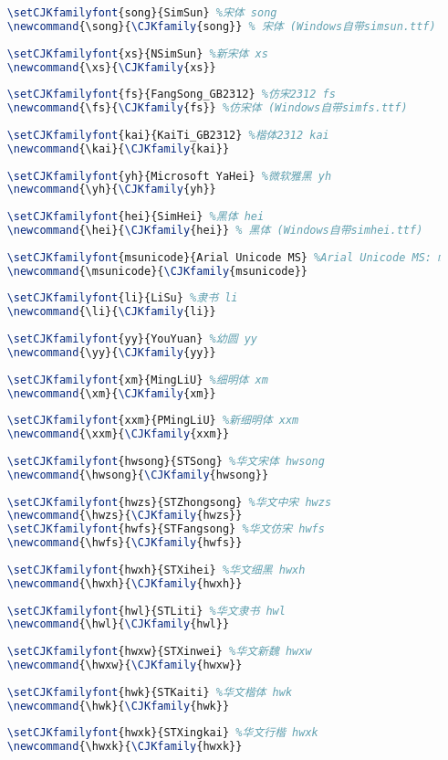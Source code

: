 \documentclass[10pt,a4paper,openany]{article}
\newcommand{\song}{\CJKfamily{song}} %
\newcommand{\xs}{\CJKfamily{xs}}
\newcommand{\fs}{\CJKfamily{fs}} %
\newcommand{\kai}{\CJKfamily{kai}}
\newcommand{\yh}{\CJKfamily{yh}}
\newcommand{\hei}{\CJKfamily{hei}} %
\newcommand{\msunicode}{\CJKfamily{msunicode}}
\newcommand{\li}{\CJKfamily{li}}
\newcommand{\yy}{\CJKfamily{yy}}
\newcommand{\xm}{\CJKfamily{xm}}
\newcommand{\xxm}{\CJKfamily{xxm}}
\newcommand{\hwsong}{\CJKfamily{hwsong}}
\newcommand{\hwzs}{\CJKfamily{hwzs}}
\newcommand{\hwfs}{\CJKfamily{hwfs}}
\newcommand{\hwxh}{\CJKfamily{hwxh}}
\newcommand{\hwl}{\CJKfamily{hwl}}
\newcommand{\hwxw}{\CJKfamily{hwxw}}
\newcommand{\hwk}{\CJKfamily{hwk}}
\newcommand{\hwxk}{\CJKfamily{hwxk}}
\begin{document}
	\begin{lstlisting}[language=tex]
	%-------------添加windows本地系统内的字体-------------
	\setCJKfamilyfont{song}{SimSun} %宋体 song
	\newcommand{\song}{\CJKfamily{song}} % 宋体 (Windows自带simsun.ttf)
	
	\setCJKfamilyfont{xs}{NSimSun} %新宋体 xs
	\newcommand{\xs}{\CJKfamily{xs}}
	
	\setCJKfamilyfont{fs}{FangSong_GB2312} %仿宋2312 fs
	\newcommand{\fs}{\CJKfamily{fs}} %仿宋体 (Windows自带simfs.ttf)
	
	\setCJKfamilyfont{kai}{KaiTi_GB2312} %楷体2312 kai
	\newcommand{\kai}{\CJKfamily{kai}} 
	
	\setCJKfamilyfont{yh}{Microsoft YaHei} %微软雅黑 yh
	\newcommand{\yh}{\CJKfamily{yh}}
	
	\setCJKfamilyfont{hei}{SimHei} %黑体 hei
	\newcommand{\hei}{\CJKfamily{hei}} % 黑体 (Windows自带simhei.ttf)
	
	\setCJKfamilyfont{msunicode}{Arial Unicode MS} %Arial Unicode MS: msunicode
	\newcommand{\msunicode}{\CJKfamily{msunicode}}
	
	\setCJKfamilyfont{li}{LiSu} %隶书 li
	\newcommand{\li}{\CJKfamily{li}}
	
	\setCJKfamilyfont{yy}{YouYuan} %幼圆 yy
	\newcommand{\yy}{\CJKfamily{yy}}
	
	\setCJKfamilyfont{xm}{MingLiU} %细明体 xm
	\newcommand{\xm}{\CJKfamily{xm}}
	
	\setCJKfamilyfont{xxm}{PMingLiU} %新细明体 xxm
	\newcommand{\xxm}{\CJKfamily{xxm}}
	
	\setCJKfamilyfont{hwsong}{STSong} %华文宋体 hwsong
	\newcommand{\hwsong}{\CJKfamily{hwsong}}
	
	\setCJKfamilyfont{hwzs}{STZhongsong} %华文中宋 hwzs
	\newcommand{\hwzs}{\CJKfamily{hwzs}}
	\setCJKfamilyfont{hwfs}{STFangsong} %华文仿宋 hwfs
	\newcommand{\hwfs}{\CJKfamily{hwfs}}
	
	\setCJKfamilyfont{hwxh}{STXihei} %华文细黑 hwxh
	\newcommand{\hwxh}{\CJKfamily{hwxh}}
	
	\setCJKfamilyfont{hwl}{STLiti} %华文隶书 hwl
	\newcommand{\hwl}{\CJKfamily{hwl}}
	
	\setCJKfamilyfont{hwxw}{STXinwei} %华文新魏 hwxw
	\newcommand{\hwxw}{\CJKfamily{hwxw}}
	
	\setCJKfamilyfont{hwk}{STKaiti} %华文楷体 hwk
	\newcommand{\hwk}{\CJKfamily{hwk}}
	
	\setCJKfamilyfont{hwxk}{STXingkai} %华文行楷 hwxk
	\newcommand{\hwxk}{\CJKfamily{hwxk}}
	

\end{lstlisting}
\end{document}
